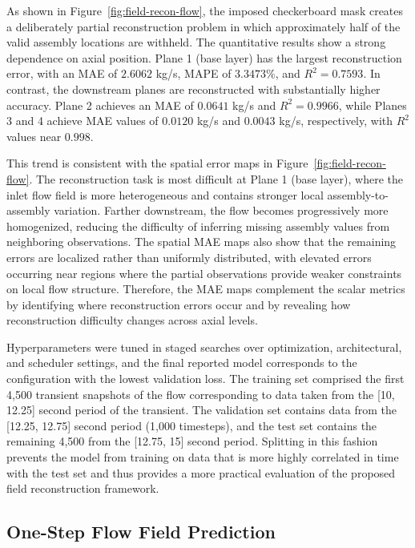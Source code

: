 \documentclass[review]{elsarticle}
\theoremstyle{definition}
\theoremstyle{definition}
\theoremstyle{remark}
\begin{document}
As shown in Figure~\ref{fig:field-recon-flow}, the imposed checkerboard mask creates a deliberately partial reconstruction problem in which approximately half of the valid assembly locations are withheld. The quantitative results show a strong dependence on axial position. Plane 1 (base layer) has the largest reconstruction error, with an MAE of $2.6062$ kg/s, MAPE of $3.3473\%$, and $R^2=0.7593$. In contrast, the downstream planes are reconstructed with substantially higher accuracy. Plane 2 achieves an MAE of $0.0641$ kg/s and $R^2=0.9966$, while Planes 3 and 4 achieve MAE values of $0.0120$ kg/s and $0.0043$ kg/s, respectively, with $R^2$ values near $0.998$.

This trend is consistent with the spatial error maps in Figure~\ref{fig:field-recon-flow}. The reconstruction task is most difficult at Plane 1 (base layer), where the inlet flow field is more heterogeneous and contains stronger local assembly-to-assembly variation. Farther downstream, the flow becomes progressively more homogenized, reducing the difficulty of inferring missing assembly values from neighboring observations. The spatial MAE maps also show that the remaining errors are localized rather than uniformly distributed, with elevated errors occurring near regions where the partial observations provide weaker constraints on local flow structure. Therefore, the MAE maps complement the scalar metrics by identifying where reconstruction errors occur and by revealing how reconstruction difficulty changes across axial levels.

Hyperparameters were tuned in staged searches over optimization, architectural, and scheduler settings, and the final reported model corresponds to the configuration with the lowest validation loss. The training set comprised the first 4,500 transient snapshots of the flow corresponding to data taken from the [10, 12.25] second period of the transient. The validation set contains data from the [12.25, 12.75] second period (1,000 timesteps), and the test set contains the remaining 4,500 from the [12.75, 15] second period. Splitting in this fashion prevents the model from training on data that is more highly correlated in time with the test set and thus provides a more practical evaluation of the proposed field reconstruction framework.


\subsection{One-Step Flow Field Prediction}
\end{document}
